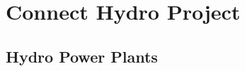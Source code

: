 \chapter{Connect Hydro Project}
\label{ChapterThree}
\section{Hydro Power Plants}
\label{HydroPowerPlants}